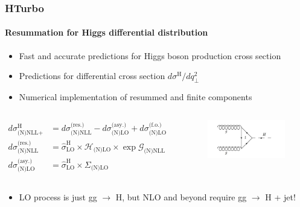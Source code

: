 \documentclass[aspectratio=43]{beamer}
\begin{document}
%
%

\begin{frame}


\end{frame}

\begin{frame}
	
	\frametitle{HTurbo}
	\framesubtitle{Resummation for Higgs differential distribution}

	\footnotesize
	
	\begin{itemize}
		\item Fast and accurate predictions for Higgs boson production cross section
		\item Predictions for differential cross section $d\sigma^{\textrm{H}} / dq_{\perp}^{2}$
		\item Numerical implementation of resummed and finite components
	\end{itemize}

	\begin{columns}
		

		\begin{align}
			d\sigma^{\textrm{H}}_{\textrm{(N)NLL+(N)LO}} &= 
			d\sigma^{\textrm{(res.)}}_{\textrm{(N)NLL}} - 
			d\sigma^{\textrm{(asy.)}}_{\textrm{(N)LO}} + 
			d\sigma^{\textrm{(f.o.)}}_{\textrm{(N)LO}} \nonumber \\
			d\sigma^{\textrm{(res.)}}_{\textrm{(N)NLL}} &= \hat{\sigma}^{\textrm{H}}_{\textrm{LO}} \times \mathcal{H}_{\textrm{(N)LO}} \times \exp{\mathcal{G}}_{\textrm{(N)NLL}} \; \nonumber \\
			d\sigma^{\textrm{(asy.)}}_{\textrm{(N)LO}} &= \hat{\sigma}^{\textrm{H}}_{\textrm{LO}} \times \Sigma_{\textrm{(N)LO}} \nonumber
		\end{align}
	
		
		\begin{figure}
			\includegraphics[width = 5 cm]{plots/part3/chapter5/higgs.png}
		\end{figure}	
		
	\end{columns}

	\begin{itemize}
		\item LO process is just gg $\rightarrow$ H, but NLO and beyond require gg $\rightarrow$ H + jet!
	\end{itemize}

\end{frame}
\end{document}
